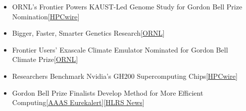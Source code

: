 \documentclass{resume} %
\let\OrigRSection\rSection
\let\OrigEndRSection\endrSection
\let\OrigMakeUppercase\MakeUppercase
\renewenvironment{rSection}[1]{
    \renewcommand{\MakeUppercase}[1]{\textcolor{blue}{\OrigMakeUppercase{##1}}}%
    \OrigRSection{#1}%
}{%
    \OrigEndRSection%
}
\begin{document}
\begin{rSection}{\faNewspaperO ~MEDIA COVERAGE}
\begin{itemize}
    \item ORNL’s Frontier Powers KAUST-Led Genome Study for Gordon Bell Prize Nomination\hfill[\href{https://www.hpcwire.com/off-the-wire/ornls-frontier-powers-kaust-led-genome-study-for-gordon-bell-prize-nomination/}{HPCwire}]
    \item Bigger, Faster, Smarter Genetics Research\hfill[\href{https://www.olcf.ornl.gov/2024/11/01/bigger-faster-smarter-genetics-research/}{ORNL}]
    \item Frontier Users’ Exascale Climate Emulator Nominated for Gordon Bell Climate Prize\hfill[\href{https://www.olcf.ornl.gov/2024/10/30/frontier-users-exascale-climate-emulator-nominated-for-gordon-bell-climate-prize/}{ORNL}]
    \item Researchers Benchmark Nvidia’s GH200 Supercomputing Chips\hfill[\href{https://www.hpcwire.com/2024/09/04/researchers-benchmark-nvidias-gh200-supercomputing-chips/}{HPCwire}]
    \item Gordon Bell Prize Finalists Develop Method for More Efficient Computing\hfill[\href{https://www.eurekalert.org/news-releases/970914}{AAAS Eurekalert}][\href{https://www.hlrs.de/news/detail/gordon-bell-award-finalists-develop-method-for-more-efficient-computing}{HLRS News}]

\end{itemize}
\end{rSection}
\end{document}

